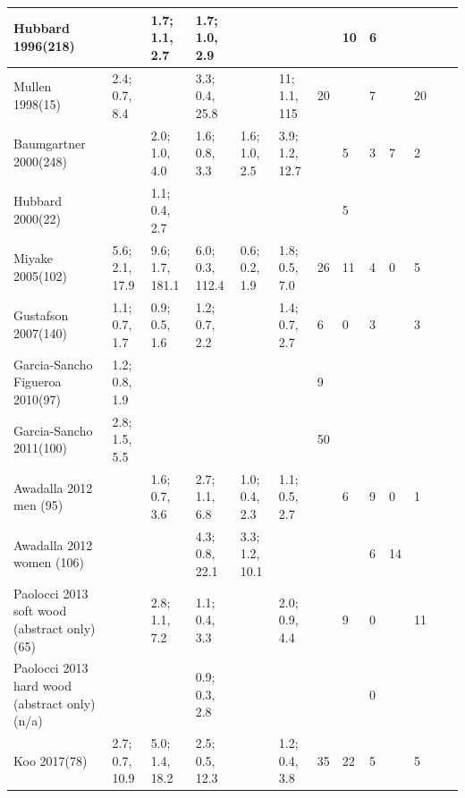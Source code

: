 \documentclass[12pt,a4paper,]{report}
\begin{document}
\begin{table}[htbp]
\begin{tabular}{|p{1.5cm}|p{0.5cm}p{0.5cm}p{0.5cm}p{0.5cm}p{0.5cm}|p{0.5cm}p{0.5cm}p{0.5cm}p{0.5cm}p{0.5cm}|p{2.5cm}|p{2cm}|}
        Hubbard 1996(218)\cite{Hubbard1996a}                 &               & 1.7; 1.1, 2.7   & 1.7; 1.0, 2.9   &               &   &  & 10  & 6   &  &\\
\hline
        Mullen 1998(15)\cite{Mullen1998}                   & 2.4; 0.7, 8.4   &               & 3.3; 0.4, 25.8  &  & 11; 1.1, 115             & 20 &    & 7  &    & 20                         \\
\hline
        Baumgartner 2000(248)\cite{Baumgartner2000}             &               & 2.0; 1.0, 4.0   & 1.6; 0.8, 3.3   & 1.6; 1.0, 2.5   & 3.9; 1.2, 12.7 &   & 5  & 3  & 7 & 2                \\
\hline
        Hubbard 2000(22)\cite{Hubbard2000}                  &               & 1.1; 0.4, 2.7   &               &               &    &   & 5   &    &  &     \\
\hline
        Miyake 2005(102)\cite{Miyake2005}                  &  5.6; 2.1, 17.9    & 9.6; 1.7, 181.1 & 6.0; 0.3, 112.4 & 0.6; 0.2, 1.9   & 1.8; 0.5, 7.0           & 26 & 11 & 4  & 0   &  5                  \\
\hline
        Gustafson 2007(140)\cite{Gustafson2007}               & 1.1; 0.7, 1.7   & 0.9; 0.5, 1.6   & 1.2; 0.7, 2.2   &   & 1.4; 0.7, 2.7           & 6  & 0   & 3  &    & 3                   \\
\hline
        Garcia-Sancho Figueroa 2010(97)\cite{Garcia-SanchoFigueroa2010}   & 1.2; 0.8, 1.9   &               &               &               &   & 9   &    &    & &                  \\
\hline
        Garcia-Sancho 2011(100)\cite{Garcia-Sancho2011}           & 2.8; 1.5, 5.5   &               &               &               &   &  50  &    &    & &                         \\
\hline
        Awadalla 2012 men (95)\cite{Awadalla2012}                &               & 1.6; 0.7, 3.6   & 2.7; 1.1, 6.8    & 1.0; 0.4, 2.3   & 1.1; 0.5, 2.7 &   & 6  & 9  & 0  & 1                         \\
\hline
        Awadalla 2012 women (106)\cite{Awadalla2012}                &               &    & 4.3; 0.8, 22.1    & 3.3; 1.2, 10.1  & &   &   & 6  & 14  &             \\
\hline
        Paolocci 2013 soft wood (abstract only)(65)\cite{Paolocci2013} &               &     2.8; 1.1, 7.2       & 1.1; 0.4, 3.3 &   & 2.0; 0.9, 4.4               &   &  9  & 0  &    & 11 \\
\hline

        Paolocci 2013 hard wood (abstract only)(n/a)\cite{Paolocci2013} &               &                        &  0.9; 0.3, 2.8    &       &               &   &    &  0 &    &        \\
\hline
        Koo 2017(78)\cite{Koo2017}                      & 2.7; 0.7, 10.9  & 5.0; 1.4, 18.2  & 2.5; 0.5, 12.3  & & 1.2; 0.4, 3.8              & 35 & 22 & 5  &    & 5     \\        
\bottomrule             
\end{tabular}
\end{table}
\end{document}
